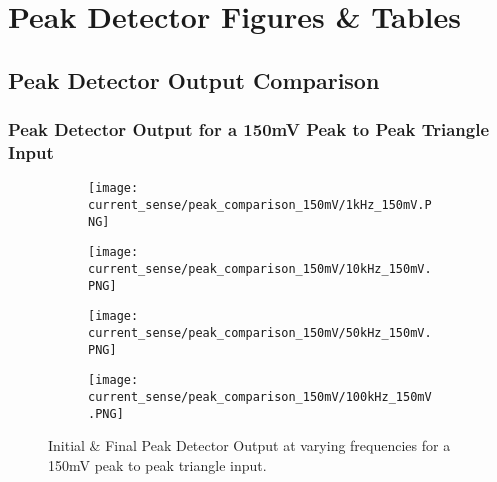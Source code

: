 \chapter{Peak Detector Figures \& Tables}\label{A:peak_detector}

\section{Peak Detector Output Comparison}\label{A:peak_detector_screenshots}

\subsection{Peak Detector Output for a 150mV Peak to Peak Triangle Input}
\begin{figure}[H]
    
    \centering
    \begin{subfigure}{0.45\textwidth}
        \texttt{[image: current\_sense/peak\_comparison\_150mV/1kHz\_150mV.PNG]}
    \end{subfigure}
    \begin{subfigure}{0.45\textwidth}
        \texttt{[image: current\_sense/peak\_comparison\_150mV/10kHz\_150mV.PNG]}
    \end{subfigure}
    \begin{subfigure}{0.45\textwidth}
        \texttt{[image: current\_sense/peak\_comparison\_150mV/50kHz\_150mV.PNG]}
    \end{subfigure}
    \begin{subfigure}{0.45\textwidth}
        \texttt{[image: current\_sense/peak\_comparison\_150mV/100kHz\_150mV.PNG]}
    \end{subfigure}
    \caption{Initial \& Final Peak Detector Output at varying frequencies for a 150mV peak to peak triangle input.}
\end{figure}


